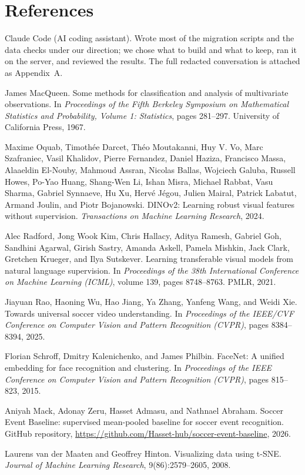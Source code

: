 \documentclass[11pt]{article}
\begin{document}
\section*{References}
\begin{enumerate}[label={[\arabic*]}, noitemsep]
  \item Claude Code (AI coding assistant). Wrote most of the migration scripts and the data checks under our
        direction; we chose what to build and what to keep, ran it on the server, and reviewed the results. The
        full redacted conversation is attached as Appendix~A.
  \item James MacQueen. Some methods for classification and analysis of multivariate observations. In
        \emph{Proceedings of the Fifth Berkeley Symposium on Mathematical Statistics and Probability, Volume 1:
        Statistics}, pages 281--297. University of California Press, 1967.
  \item Maxime Oquab, Timoth\'ee Darcet, Th\'eo Moutakanni, Huy V. Vo, Marc Szafraniec, Vasil Khalidov, Pierre
        Fernandez, Daniel Haziza, Francisco Massa, Alaaeldin El-Nouby, Mahmoud Assran, Nicolas Ballas, Wojciech
        Galuba, Russell Howes, Po-Yao Huang, Shang-Wen Li, Ishan Misra, Michael Rabbat, Vasu Sharma, Gabriel
        Synnaeve, Hu Xu, Herv\'e J\'egou, Julien Mairal, Patrick Labatut, Armand Joulin, and Piotr Bojanowski.
        DINOv2: Learning robust visual features without supervision. \emph{Transactions on Machine Learning
        Research}, 2024.
  \item Alec Radford, Jong Wook Kim, Chris Hallacy, Aditya Ramesh, Gabriel Goh, Sandhini Agarwal, Girish Sastry,
        Amanda Askell, Pamela Mishkin, Jack Clark, Gretchen Krueger, and Ilya Sutskever. Learning transferable
        visual models from natural language supervision. In \emph{Proceedings of the 38th International
        Conference on Machine Learning (ICML)}, volume 139, pages 8748--8763. PMLR, 2021.
  \item Jiayuan Rao, Haoning Wu, Hao Jiang, Ya Zhang, Yanfeng Wang, and Weidi Xie. Towards universal soccer
        video understanding. In \emph{Proceedings of the IEEE/CVF Conference on Computer Vision and Pattern
        Recognition (CVPR)}, pages 8384--8394, 2025.
  \item Florian Schroff, Dmitry Kalenichenko, and James Philbin. FaceNet: A unified embedding for face
        recognition and clustering. In \emph{Proceedings of the IEEE Conference on Computer Vision and Pattern
        Recognition (CVPR)}, pages 815--823, 2015.
  \item Aniyah Mack, Adonay Zeru, Hasset Admasu, and Nathnael Abraham. Soccer Event Baseline: supervised
        mean-pooled baseline for soccer event recognition. GitHub repository,
        \url{https://github.com/Hasset-hub/soccer-event-baseline}, 2026.
  \item Laurens van der Maaten and Geoffrey Hinton. Visualizing data using t-SNE. \emph{Journal of Machine
        Learning Research}, 9(86):2579--2605, 2008.
\end{enumerate}
\end{document}
